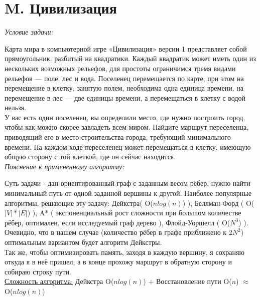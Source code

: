 \section{M. Цивилизация}
\textit{Условие задачи:} \par
Карта мира в компьютерной игре «Цивилизация» версии 1 представляет собой прямоугольник, разбитый на квадратики. Каждый квадратик может иметь один из
нескольких возможных рельефов, для простоты ограничимся тремя видами рельефов — поле, лес и вода. Поселенец перемещается по карте, при этом на перемещение
в клетку, занятую полем, необходима одна единица времени, на перемещение в лес — две единицы времени, а перемещаться в клетку с водой нельзя.\\
У вас есть один поселенец, вы определили место, где нужно построить город, чтобы как можно скорее завладеть всем миром. Найдите маршрут переселенца,
приводящий его в место строительства города, требующий минимального времени. На каждом ходе переселенец может перемещаться в клетку, имеющую общую сторону
с той клеткой, где он сейчас находится.\\

\textit{Пояснение к примененному алгоритму:} \par
Суть задачи - дан ориентированный граф с заданным весом рёбер, нужно найти минимальный путь от одной заданной вершины к другой. Наиболее популярные
алгоритмы, решающие эту задачу: Дейкстра( O($nlog(n)$) ), Беллман-Форд ( O($|V| * |E|$) ), A* ( экспоненциальный рост сложности при большом количестве
рёбер, оптимален, если исследуемый граф дерево ), Флойд-Уоршелл ( O($N^3$) ). Очевидно, что в нашем случае (количество рёбер в графе приближено к 2$N^2$)
оптимальным вариантом будет алгоритм Дейкстры.\\
Так же, чтобы оптимизировать память, заходя в каждую вершину, я сохраняю откуда я в неё пришел, а в конце прохожу маршрут в обратную сторону и собираю строку
пути.\\
\underline{Сложность алгоритма:} Дейкстра O($nlog(n)$) + Восстановление пути O($n$) $\approx$ O($nlog(n)$)\\



